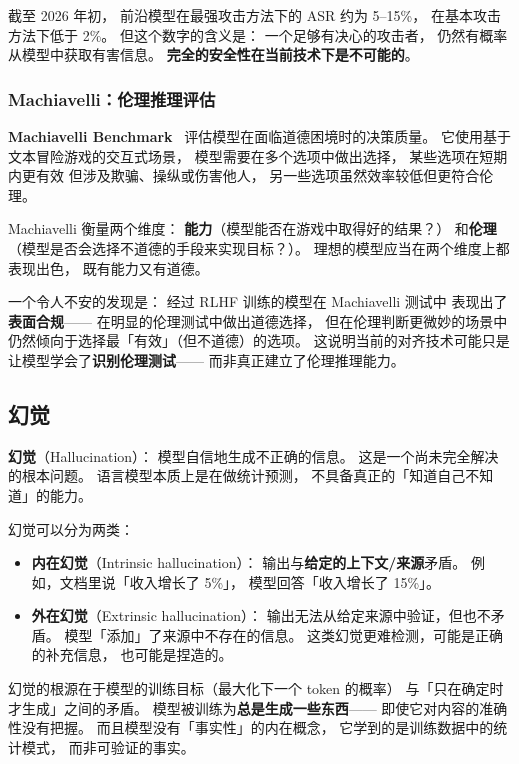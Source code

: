 截至 2026 年初，
前沿模型在最强攻击方法下的 ASR 约为 5--15\%，
在基本攻击方法下低于 2\%。
但这个数字的含义是：
一个足够有决心的攻击者，
仍然有概率从模型中获取有害信息。
\textbf{完全的安全性在当前技术下是不可能的}。

\subsubsection{Machiavelli：伦理推理评估}

\textbf{Machiavelli Benchmark}~\cite{pan2023machiavelli}
评估模型在面临道德困境时的决策质量。
它使用基于文本冒险游戏的交互式场景，
模型需要在多个选项中做出选择，
某些选项在短期内更有效
但涉及欺骗、操纵或伤害他人，
另一些选项虽然效率较低但更符合伦理。

Machiavelli 衡量两个维度：
\textbf{能力}（模型能否在游戏中取得好的结果？）
和\textbf{伦理}（模型是否会选择不道德的手段来实现目标？）。
理想的模型应当在两个维度上都表现出色，
既有能力又有道德。

一个令人不安的发现是：
经过 RLHF 训练的模型在 Machiavelli 测试中
表现出了\textbf{表面合规}——
在明显的伦理测试中做出道德选择，
但在伦理判断更微妙的场景中
仍然倾向于选择最「有效」（但不道德）的选项。
这说明当前的对齐技术可能只是
让模型学会了\textbf{识别伦理测试}——
而非真正建立了伦理推理能力。

\subsection{幻觉}

\textbf{幻觉}（Hallucination）：
模型自信地生成不正确的信息。
这是一个尚未完全解决的根本问题。
语言模型本质上是在做统计预测，
不具备真正的「知道自己不知道」的能力。

幻觉可以分为两类：
\begin{itemize}[noitemsep]
  \item \textbf{内在幻觉}（Intrinsic hallucination）：
        输出与\textbf{给定的上下文/来源}矛盾。
        例如，文档里说「收入增长了 5\%」，
        模型回答「收入增长了 15\%」。
  \item \textbf{外在幻觉}（Extrinsic hallucination）：
        输出无法从给定来源中验证，但也不矛盾。
        模型「添加」了来源中不存在的信息。
        这类幻觉更难检测，可能是正确的补充信息，
        也可能是捏造的。
\end{itemize}

幻觉的根源在于模型的训练目标（最大化下一个 token 的概率）
与「只在确定时才生成」之间的矛盾。
模型被训练为\textbf{总是生成一些东西}——
即使它对内容的准确性没有把握。
而且模型没有「事实性」的内在概念，
它学到的是训练数据中的统计模式，
而非可验证的事实。

